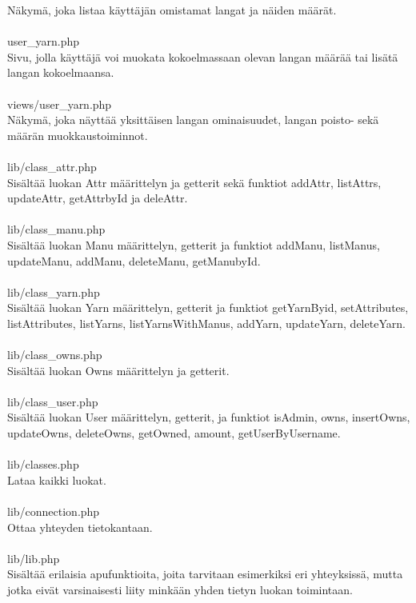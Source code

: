 \documentclass[12pt]{article}
\begin{document}
Näkymä, joka listaa käyttäjän omistamat langat ja näiden määrät.\\
\ \\
user\_yarn.php\\
Sivu, jolla käyttäjä voi muokata kokoelmassaan olevan langan määrää tai lisätä langan kokoelmaansa.\\
\ \\
views/user\_yarn.php\\
Näkymä, joka näyttää yksittäisen langan ominaisuudet, langan poisto- sekä määrän muokkaustoiminnot.\\
\ \\
lib/class\_attr.php\\
Sisältää luokan Attr määrittelyn ja getterit sekä funktiot addAttr, listAttrs, updateAttr, getAttrbyId ja deleAttr.\\
\ \\
lib/class\_manu.php\\
Sisältää luokan Manu määrittelyn, getterit ja funktiot addManu, listManus, updateManu, addManu, deleteManu, getManubyId.\\
\ \\
lib/class\_yarn.php\\
Sisältää luokan Yarn määrittelyn, getterit ja funktiot getYarnByid, setAttributes, listAttributes, listYarns, listYarnsWithManus, addYarn, updateYarn, deleteYarn.\\
\ \\
lib/class\_owns.php\\
Sisältää luokan Owns määrittelyn ja getterit.\\
\ \\
lib/class\_user.php\\
Sisältää luokan User määrittelyn, getterit, ja funktiot isAdmin, owns, insertOwns, updateOwns, deleteOwns, getOwned, amount, getUserByUsername.\\
\ \\
lib/classes.php\\
Lataa kaikki luokat.\\
\ \\
lib/connection.php\\
Ottaa yhteyden tietokantaan.\\
\ \\
lib/lib.php\\
Sisältää erilaisia apufunktioita, joita tarvitaan esimerkiksi eri yhteyksissä, mutta jotka eivät varsinaisesti liity minkään yhden tietyn luokan toimintaan.\\
\ \\
\end{document}
